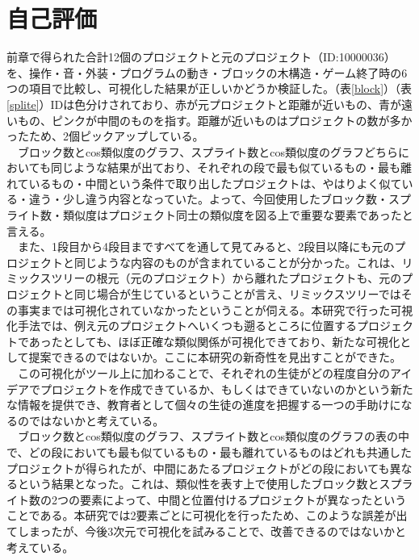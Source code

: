 \documentclass[a4paper,10pt,onecolumn,oneside,openany]{jsbook}
\begin{document}
\section{自己評価}
前章で得られた合計12個のプロジェクトと元のプロジェクト（ID:10000036）を、操作・音・外装・プログラムの動き・ブロックの木構造・ゲーム終了時の6つの項目で比較し、可視化した結果が正しいかどうか検証した。（表\ref{block}）（表\ref{splite}）IDは色分けされており、赤が元プロジェクトと距離が近いもの、青が遠いもの、ピンクが中間のものを指す。距離が近いものはプロジェクトの数が多かったため、2個ピックアップしている。
\\
　ブロック数とcos類似度のグラフ、スプライト数とcos類似度のグラフどちらにおいても同じような結果が出ており、それぞれの段で最も似ているもの・最も離れているもの・中間という条件で取り出したプロジェクトは、やはりよく似ている・違う・少し違う内容となっていた。よって、今回使用したブロック数・スプライト数・類似度はプロジェクト同士の類似度を図る上で重要な要素であったと言える。
\\
　また、1段目から4段目まですべてを通して見てみると、2段目以降にも元のプロジェクトと同じような内容のものが含まれていることが分かった。これは、リミックスツリーの根元（元のプロジェクト）から離れたプロジェクトも、元のプロジェクトと同じ場合が生じているということが言え、リミックスツリーではその事実までは可視化されていなかったということが伺える。本研究で行った可視化手法では、例え元のプロジェクトへいくつも遡るところに位置するプロジェクトであったとしても、ほぼ正確な類似関係が可視化できており、新たな可視化として提案できるのではないか。ここに本研究の新奇性を見出すことができた。
\\
　この可視化がツール上に加わることで、それぞれの生徒がどの程度自分のアイデアでプロジェクトを作成できているか、もしくはできていないのかという新たな情報を提供でき、教育者として個々の生徒の進度を把握する一つの手助けになるのではないかと考えている。
\\
　ブロック数とcos類似度のグラフ、スプライト数とcos類似度のグラフの表の中で、どの段においても最も似ているもの・最も離れているものはどれも共通したプロジェクトが得られたが、中間にあたるプロジェクトがどの段においても異なるという結果となった。これは、類似性を表す上で使用したブロック数とスプライト数の2つの要素によって、中間と位置付けるプロジェクトが異なったということである。本研究では2要素ごとに可視化を行ったため、このような誤差が出てしまったが、今後3次元で可視化を試みることで、改善できるのではないかと考えている。
\\
\\
\\
 
\end{document}
